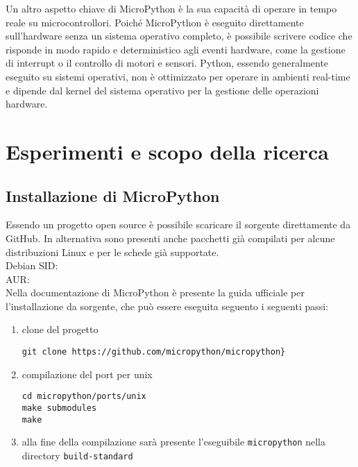 \documentclass[12pt,a4paper]{report}
\begin{document}
Un altro aspetto chiave di MicroPython è la sua capacità di operare in tempo reale su microcontrollori. Poiché MicroPython è eseguito direttamente sull'hardware senza un sistema operativo completo, è possibile scrivere codice che risponde in modo rapido e deterministico agli eventi hardware, come la gestione di interrupt o il controllo di motori e sensori. Python, essendo generalmente eseguito su sistemi operativi, non è ottimizzato per operare in ambienti real-time e dipende dal kernel del sistema operativo per la gestione delle operazioni hardware.

\chapter{Esperimenti e scopo della ricerca}

\section{Installazione di
MicroPython}\label{installazione-di-micropython}

Essendo un progetto open source è possibile scaricare il sorgente
direttamente da GitHub. In alternativa sono presenti anche pacchetti già
compilati per alcune distribuzioni Linux e per le schede già
supportate.\\
Debian SID: \cite{debian_sid} \\
AUR:\cite{aur_arch} \\
Nella documentazione di MicroPython \cite{micropython_getting_started} è presente la guida ufficiale per
l'installazione da sorgente, che può essere eseguita
seguento i seguenti passi:

\begin{enumerate}
\item
  clone del progetto
\begin{verbatim}
git clone https://github.com/micropython/micropython}
\end{verbatim}
\item
  compilazione del port per unix
\begin {verbatim} 
cd micropython/ports/unix
make submodules
make
\end{verbatim}
\end{enumerate}

\begin{enumerate}
\setcounter{enumi}{2}
\item
  alla fine della compilazione sarà presente
  l'eseguibile \texttt{micropython} nella directory
  \texttt{build-standard}
\end{enumerate}
\end{document}

